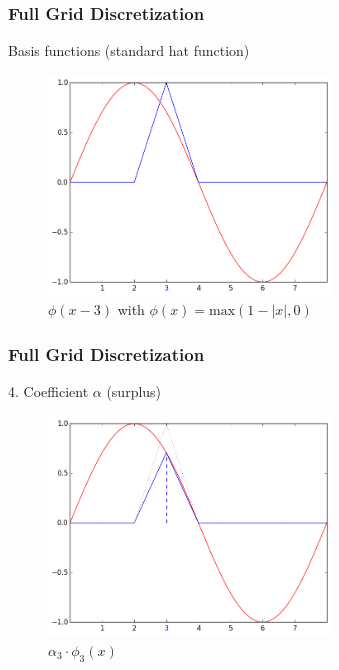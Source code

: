 \begin{frame}
  \frametitle{Full Grid Discretization}
  \topline
  \vspace{-10px}
  \begin{block}{Basis functions (standard hat function)}
    \begin{figure}[!htp]

      \centering
      \includegraphics[width=7.5cm]{images/singlebasis_3}
      \vspace{-12px}
      \caption{$\phi(x - 3)$ with $\phi(x) = \text{max}(1 - |x|, 0)$}
    \end{figure}
  \end{block}
\end{frame}

\begin{frame}
  \frametitle{Full Grid Discretization}
  \topline
  \vspace{-10px}
  \begin{block}{4. Coefficient $\alpha$ (surplus)}
    \begin{figure}[!htp]

      \centering
      \includegraphics[width=7.5cm]{images/singlebasis_4}
      \vspace{-12px}
      \caption{$\alpha_3 \cdot \phi_3(x)$}
    \end{figure}
  \end{block}
\end{frame}


